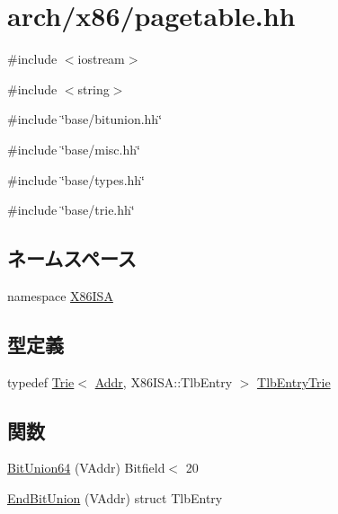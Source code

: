 \hypertarget{x86_2pagetable_8hh}{
\section{arch/x86/pagetable.hh}
\label{x86_2pagetable_8hh}
}
{\ttfamily \#include $<$iostream$>$}\par
{\ttfamily \#include $<$string$>$}\par
{\ttfamily \#include \char`\"{}base/bitunion.hh\char`\"{}}\par
{\ttfamily \#include \char`\"{}base/misc.hh\char`\"{}}\par
{\ttfamily \#include \char`\"{}base/types.hh\char`\"{}}\par
{\ttfamily \#include \char`\"{}base/trie.hh\char`\"{}}\par
\subsection*{ネームスペース}
\begin{DoxyCompactItemize}
\item 
namespace \hyperlink{namespaceX86ISA}{X86ISA}
\end{DoxyCompactItemize}
\subsection*{型定義}
\begin{DoxyCompactItemize}
\item 
typedef \hyperlink{classTrie}{Trie}$<$ \hyperlink{base_2types_8hh_af1bb03d6a4ee096394a6749f0a169232}{Addr}, X86ISA::TlbEntry $>$ \hyperlink{x86_2pagetable_8hh_a1a855102cbce9987409c2af2be05f316}{TlbEntryTrie}
\end{DoxyCompactItemize}
\subsection*{関数}
\begin{DoxyCompactItemize}
\item 
\hyperlink{namespaceX86ISA_afe8a46f6c035b6b4692b3b13071e48b4}{BitUnion64} (VAddr) Bitfield$<$ 20
\item 
\hyperlink{namespaceX86ISA_a0e90d862d83a06c8942fdd136b580e74}{EndBitUnion} (VAddr) struct TlbEntry
\end{DoxyCompactItemize}
